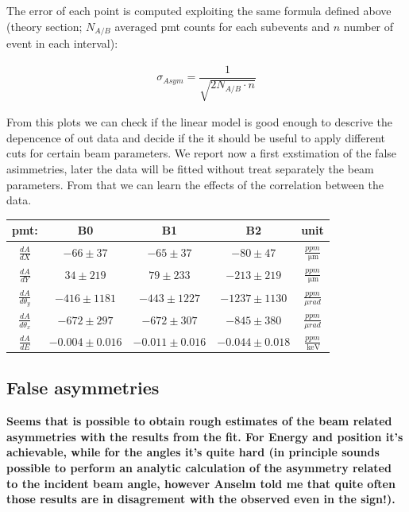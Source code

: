{The error of each point is computed exploiting the same formula defined above (theory section; $N_{A/B}$ averaged pmt counts for each subevents and $n$ number of event in each interval):

\begin{align*}
\sigma_{Asym} = \dfrac{1}{\sqrt{2N_{A/B} \cdot n}}
\end{align*}

From this plots we can check if the linear model is good enough to descrive the depencence of out data and decide if the it should be useful to apply different cuts for certain beam parameters. We report now a first exstimation of the false asimmetries, later the data will be fitted without treat separately the beam parameters. From that we can learn the effects of the correlation between the data.

\begin{center}
\begin{tabular}{||c|c|c|c|c|}
\hline
pmt: & B0 & B1 & B2 & unit \\ 
\hline 
$\frac{dA}{dX} $  & $-66 \pm 37$ & $-65 \pm 37$ & $-80 \pm 47$ & $ \frac{ppm}{\SI{}{\micro \meter}}$\\ 
\hline 
$\frac{dA}{dY} $  & $34 \pm 219$  & $ 79 \pm 233$ & $ -213 \pm 219$ & $\frac{ppm}{\SI{}{\micro \meter} }$ \\ 
\hline 
$\frac{dA}{d\theta_{y}}$ & $-416 \pm 1181$  & $ -443 \pm 1227$ & $-1237 \pm 1130$ & $\frac{ppm}{\mu rad}$\\ 
\hline 
$\frac{dA}{d\theta_{x}}$ & $-672 \pm 297$ & $ -672 \pm 307 $ & $-845 \pm 380$ & $\frac{ppm}{\mu rad}$ \\ 
\hline 
$\frac{dA}{dE}$ & $ -0.004 \pm 0.016 $ & $-0.011 \pm 0.016 $ & $ - 0.044 \pm 0.018 $ & $\frac{ppm}{\SI{}{\kilo \electronvolt}}$\\ 
\hline
\end{tabular} 
\end{center}


\subsection{False asymmetries}
{\bfseries Seems that is possible to obtain rough estimates of the beam related asymmetries with the results from the fit. For Energy and position it's achievable, while for the angles it's quite hard (in principle sounds possible to perform an analytic calculation of the asymmetry related to the incident beam angle, however Anselm told me that quite often those results are in disagrement with the observed even in the sign!).} \\

}
